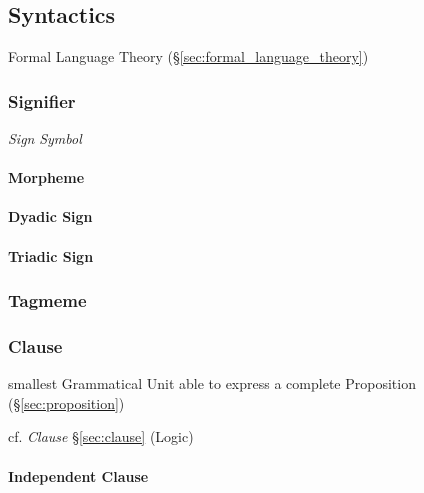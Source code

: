 \subsection{Syntactics}\label{sec:syntactics}

Formal Language Theory (\S\ref{sec:formal_language_theory})

\subsubsection{Signifier}\label{sec:signifier}

\emph{Sign} \emph{Symbol}

\paragraph{Morpheme}\label{sec:morpheme}



\paragraph{Dyadic Sign}\label{sec:dyadic_sign}

\paragraph{Triadic Sign}\label{sec:triadic_sign}



\subsubsection{Tagmeme}\label{sec:tagmeme}



\subsubsection{Clause}\label{sec:grammatical_clause}

smallest Grammatical Unit able to express a complete Proposition
(\S\ref{sec:proposition})

cf. \emph{Clause} \S\ref{sec:clause} (Logic)



\paragraph{Independent Clause}\label{sec:independent_clause}\hfill \\



